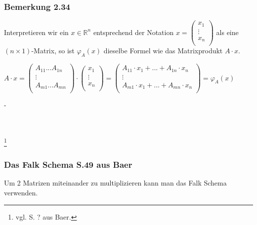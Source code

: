 \documentclass{article}
\begin{document}
\subsubsection*{Bemerkung 2.34}
Interpretieren wir ein $x \in \mathbb{R}^n$ entsprechend der Notation $x = \begin{pmatrix}
    x_1 \\
    \vdots \\
    x_n \\
\end{pmatrix}$ als eine $(n \times 1)$-Matrix, so ist $\varphi_A(x) $ dieselbe Formel wie das Matrixprodukt $A \cdot x$. \\
\begin{center}
    $A \cdot x = \begin{pmatrix}
        A_{11} ... A_{1n} \\
        \vdots \\
        A_{m1} ... A_{mn} \\
    \end{pmatrix} \cdot \begin{pmatrix}
        x_1 \\
        \vdots \\
        x_n \\
    \end{pmatrix} = \begin{pmatrix}
        A_{11} \cdot x_1 + ... + A_{1n} \cdot x_n \\
        \vdots \\
        A_{m1} \cdot x_1 + ... + A_{mn} \cdot x_n \\
    \end{pmatrix} = \varphi_A(x)$
\end{center}
-
\\
\\
\\
\date{Donnerstag, 16.11.23} \footnote{vgl. S. ? aus Baer.} \\

\subsubsection*{Das Falk Schema S.49 aus Baer}
Um 2 Matrizen miteinander zu multiplizieren kann man das Falk Schema verwenden. \\
\end{document}
